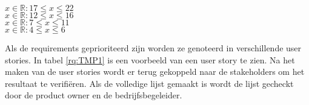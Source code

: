 \whitespace
{} $ x \in \mathbb{R} : 17 \leq x \leq 22 $ \\
 $ x \in \mathbb{R} : 12 \leq x \leq 16 $ \\
 $ x \in \mathbb{R} : 7 \leq x \leq 11 $ \\
 $ x \in \mathbb{R} : 4 \leq x \leq 6 $

\whitespace
Als de requirements geprioriteerd zijn worden ze genoteerd in verschillende user stories.
In tabel \ref{rq:TMP1} is een voorbeeld van een user story te zien.
Na het maken van de user stories wordt er terug gekoppeld naar de stakeholders om het resultaat te verifiëren.
Als de volledige lijst gemaakt is wordt de lijst gecheckt door de product owner en de bedrijfsbegeleider.


